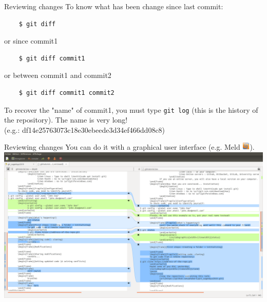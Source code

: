 \documentclass{beamer}
\newcommand{\cmd}[1]{\fbox{\color{black}\texttt{#1}}}
\begin{document}
	\begin{frame}[fragile]{Reviewing changes\hfill \cmd{diff}}
	To know what has been change since last commit:
	\begin{verbatim}
	$ git diff
	\end{verbatim}
	or since commit1 
	\begin{verbatim}
	$ git diff commit1
	\end{verbatim}
	or between commit1 and commit2
	\begin{verbatim}
	$ git diff commit1 commit2
	\end{verbatim}
	\begin{tcolorbox}[colback=cyan!30]
	To recover the "name" of commit1, you must type \texttt{git log} (this is the history of the repository). The name is very long!\\
	(e.g.: df14e25763073c18e30ebeede3d34ef466dd08c8)
	\end{tcolorbox}
	\end{frame}

	\begin{frame}{Reviewing changes\hfill \cmd{diff}}
	You can do it with a graphical user interface (e.g. Meld \includegraphics[height=1em]{meld_logo}).\\
	\vspace{1em}
	\includegraphics[width=\linewidth]{meld_ps}
	\end{frame}
\end{document}
